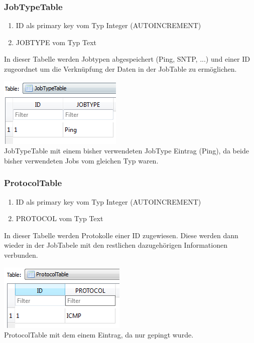 \documentclass[12pt,a4paper]{report}
\begin{document}
\begin{onehalfspace}
\subsubsection{JobTypeTable}
\begin{enumerate}
\item ID als primary key vom Typ Integer (AUTOINCREMENT)
\item JOBTYPE vom Typ Text
\end{enumerate}
In dieser Tabelle werden Jobtypen abgespeichert (Ping, SNTP, ...) und einer ID zugeordnet um die Verknüpfung der Daten in der JobTable zu ermöglichen.
\begin{center}
\includegraphics[scale=0.8]{img/db-tb-jobtype.png}\\
JobTypeTable mit einem bisher verwendeten JobType Eintrag (Ping), da beide bisher verwendeten Jobs vom gleichen Typ waren.
\end{center}
\subsubsection{ProtocolTable}
\begin{enumerate}
\item ID als primary key vom Typ Integer (AUTOINCREMENT)
\item PROTOCOL vom Typ Text
\end{enumerate}
In dieser Tabelle werden Protokolle einer ID zugewiesen. Diese werden dann wieder in der JobTabele mit den restlichen dazugehörigen Informationen verbunden.
\begin{center}
\includegraphics[scale=0.8]{img/db-tb-protocol.png}\\
ProtocolTable mit dem einem Eintrag, da nur gepingt wurde.
\end{center}

\end{onehalfspace}
\end{document}
